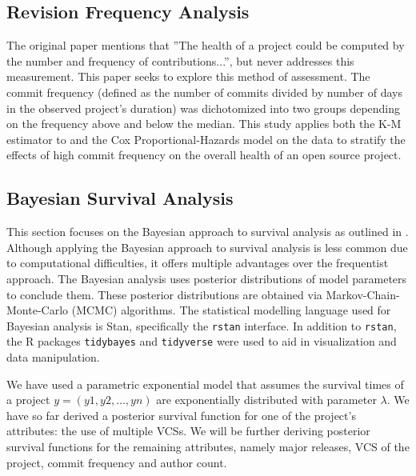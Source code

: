 \documentclass[acmconf]{acmart}
\begin{document}
\subsection{Revision Frequency Analysis}

The original paper mentions that ''The health of a project could be computed by the number and frequency of contributions...'', but never addresses this measurement.
This paper seeks to explore this method of assessment. 
The commit frequency (defined as the number of commits divided by number of days in the observed project's duration) was dichotomized into two groups depending on the frequency above and below the median. 
This study applies both the K-M estimator to and the Cox Proportional-Hazards model on the data to stratify the effects of high commit frequency on the overall health of an open source project.

\subsection{Bayesian Survival Analysis}

This section focuses on the Bayesian approach to survival analysis as outlined in \cite{kelter2020bayesian}. 
Although applying the Bayesian approach to survival analysis is less common due to computational difficulties, it offers multiple advantages over the frequentist approach. 
The Bayesian analysis uses posterior distributions of model parameters to conclude them. 
These posterior distributions are obtained via Markov-Chain-Monte-Carlo (MCMC) algorithms. 
The statistical modelling language used for Bayesian analysis is Stan, specifically the \lstinline!rstan! interface. In addition to \lstinline!rstan!, the R packages \lstinline[language=R]!tidybayes! and \lstinline[language=R]!tidyverse! were used to aid in visualization and data manipulation.

We have used a parametric exponential model that assumes the survival times of a project $y = (y1, y2, \dots , yn)$ are exponentially distributed with parameter $\lambda$.
We have so far derived a posterior survival function for one of the project's attributes: the use of multiple VCSs. 
We will be further deriving posterior survival functions for the remaining attributes, namely major releases, VCS of the project, commit frequency and author count. 
\end{document}
